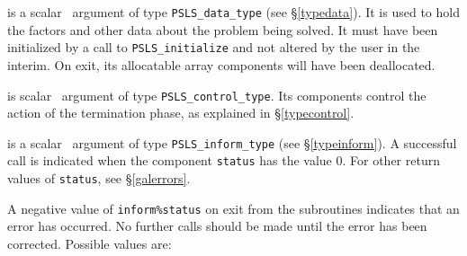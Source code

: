 \documentclass{galahad}
\newcommand{\packagename}{PSLS}
\begin{document}
\begin{description}

 is a scalar \intentinout\ argument of type
{\tt \packagename\_data\_type}
(see \S\ref{typedata}). It is used to hold the factors and other
data about the problem being solved.
It must have been initialized by a call to
{\tt \packagename\_ini\-tialize} and not altered by the user in the interim.
On exit, its allocatable array components will have been deallocated.

 is scalar \intentin\ argument of type
{\tt \packagename\_control\_type}. Its components control the action
of the termination phase, as explained in
\S\ref{typecontrol}.

 is a scalar \intentinout\ argument of type
{\tt \packagename\_inform\_type}
(see \S\ref{typeinform}).
A successful call is indicated when the  component {\tt status} has the value 0.
For other return values of {\tt status}, see \S\ref{galerrors}.

\end{description}


\galerrors
A negative value of {\tt inform\%status} on exit from the subroutines
indicates that an error has occurred. No further calls should be made
until the error has been corrected. Possible values are:
\end{document}
